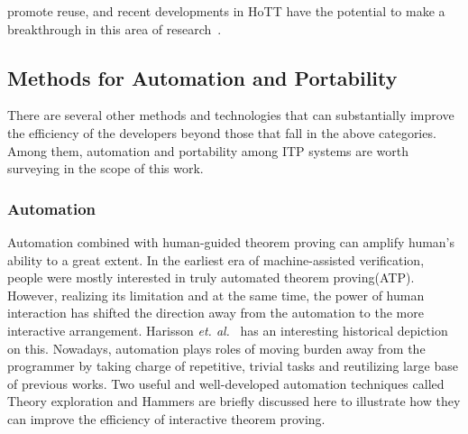promote reuse, and recent developments in HoTT have the potential to make a breakthrough in this area of research~\cite{Ringer_et_al_2019}. 






\subsection{Methods for Automation and Portability}
There are several other methods and technologies that can substantially improve the efficiency of the developers beyond those that fall in the above categories. Among them, automation and portability among ITP systems are worth surveying in the scope of this work. 

\subsubsection{Automation}
Automation combined with human-guided theorem proving can amplify human's ability to a great extent. In the earliest era of machine-assisted verification, people were mostly interested in truly automated theorem proving(ATP). However, realizing its limitation and at the same time, the power of human interaction has shifted the direction away from the automation to the more interactive arrangement. Harisson \emph{et. al.}~\cite{Harrison_et_al_2014} has an interesting historical depiction on this. Nowadays, automation plays roles of moving burden away from the programmer by taking charge of repetitive, trivial tasks and reutilizing large base of previous works. Two useful and well-developed automation techniques called Theory exploration and Hammers are briefly discussed here to illustrate how they can improve the efficiency of interactive theorem proving. \\

